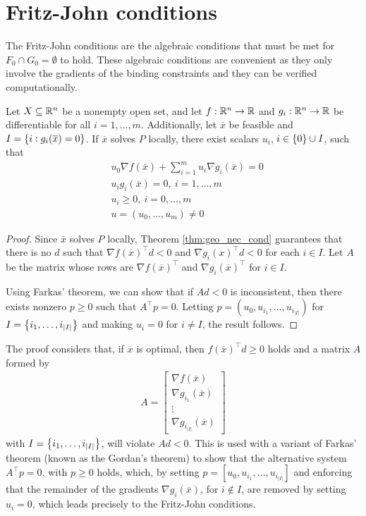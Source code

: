\section{Fritz-John conditions}

The Fritz-John conditions are the algebraic conditions that must be met for $F_0 \cap G_0 = \emptyset$ to hold. These algebraic conditions are convenient as they only involve the gradients of the binding constraints and they can be verified computationally.
%
\begin{theorem} \label{thm:FJ_conditions}
Let $X \subseteq \mathbb{R}^n$ be a nonempty open set, and let $f:\mathbb{R}^n \rightarrow \mathbb{R}$ and $g_i:\mathbb{R}^n \rightarrow \mathbb{R}$ be differentiable for all $i = 1, \dots,m$. Additionally, let $\overline{x}$ be feasible and $I = \left\{ i : g_i(\overline{x}) = 0 \right \}$. If $\overline{x}$ solves $P$ locally, there exist scalars $u_i$, $i \in \left\{ 0 \right \} \cup I$, such that
\begin{align*}
& u_0 \nabla f(\overline{x}) + \sum_{i=1}^m u_i \nabla g_i(\overline{x}) = 0\\
& u_i g_i(\overline{x}) = 0, \ i = 1,\dots,m\\
&u_i \geq 0, \ i = 0, \dots, m\\
&u = (u_0,\dots, u_m) \neq 0
\end{align*}
\end{theorem}
%
\begin{proof}
Since $\overline{x}$ solves $P$ locally, Theorem \ref{thm:geo_nec_cond} guarantees that there is no $d$ such that $\nabla f(\overline{x})^\top d < 0$ and $\nabla g_i(x)^\top d < 0$ for each $i \in I$. Let $A$ be the matrix whose rows are $\nabla f(\overline{x})^\top$ and $\nabla g_i(\overline{x})^\top$ for $i \in I$. 

Using Farkas' theorem, we can show that if $Ad < 0$ is inconsistent, then there exists nonzero $p \geq 0$ such that $A^\top p = 0$. Letting $p =(u_0, u_{i_1}, \dots, u_{i_{|I|}})$ for $I = \left\{ i_1, \dots, i_{|I|} \right \}$ and making $u_i = 0$ for $i \neq I$, the result follows. 
\end{proof}

The proof considers that, if $\overline{x}$ is optimal, then $f(\overline{x})^\top d \geq 0$ holds and a matrix $A$ formed by 
\begin{align*}
	A = \begin{bmatrix}
		\nabla f(\overline{x}) \\
		\nabla g_{i_1}(\overline{x})\\
		\vdots \\
		\nabla g_{i_|I|}(\overline{x})
	\end{bmatrix}
\end{align*}
with $I = \left\{ i_1, \dots, i_{|I|} \right \}$, will violate $Ad<0$. This is used with a variant of Farkas' theorem (known as the Gordan's theorem) to show that the alternative system $A^\top p = 0$, with $p \geq 0$ holds, which, by setting $p = [u_0, u_{i_1}, \dots, u_{i_|I|}]$ and enforcing that the remainder of the gradients $\nabla g_i(\overline{x})$, for $i \notin I$, are removed by setting $u_i = 0$, which leads precisely to the Fritz-John conditions.


